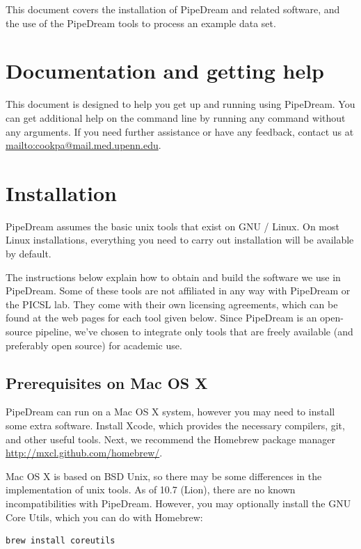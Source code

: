\documentclass{InsightArticle}
\begin{document}
This document covers the installation of PipeDream and related software, and the use of the PipeDream tools to process an example data set.


\section{Documentation and getting help}

This document is designed to help you get up and running using PipeDream. You can get additional help on the command line by running any command without any arguments. If you need further assistance or have any feedback, contact us at \url{mailto:cookpa@mail.med.upenn.edu}.

\section{Installation}

PipeDream assumes the basic unix tools that exist on GNU / Linux. On most Linux installations, everything you need to carry out installation will be available by default. 

The instructions below explain how to obtain and build the software we use in PipeDream. Some of these tools are not affiliated in any way with PipeDream or the PICSL lab. They come with their own licensing agreements, which can be found at the web pages for each tool given below. Since PipeDream is an open-source pipeline, we've chosen to integrate only tools that are freely available (and preferably open source) for academic use.

\subsection{Prerequisites on Mac OS X}

PipeDream can run on a Mac OS X system, however you may need to install some extra software. Install Xcode, which provides the necessary compilers, git, and other useful tools. Next, we recommend the Homebrew package manager \url{http://mxcl.github.com/homebrew/}. 

Mac OS X is based on BSD Unix, so there may be some differences in the implementation of unix tools. As of 10.7 (Lion), there are no known incompatibilities with PipeDream. However, you may optionally install the GNU Core Utils, which you can do with Homebrew:
\begin{lstlisting}[style=bash]
  brew install coreutils
\end{lstlisting}
\end{document}
